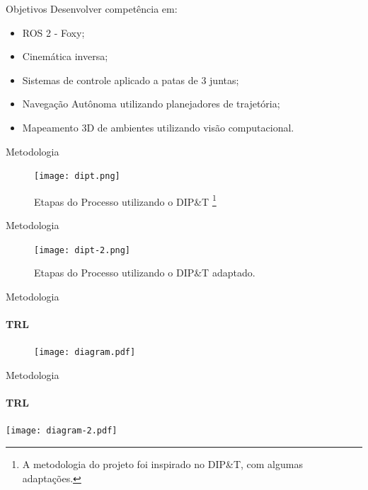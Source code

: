 \begin{frame}[t]{Objetivos}
    Desenvolver competência em:
    \begin{itemize}
        \item ROS 2 - Foxy;
        \item Cinemática inversa;
        \item Sistemas de controle aplicado a patas de 3 juntas;
        \item Navegação Autônoma utilizando planejadores de trajetória;
        \item Mapeamento 3D de ambientes utilizando visão computacional.
    \end{itemize}
\end{frame}

\begin{frame}[t]{Metodologia} 
    \transdissolve[duration=0.5]
    \centering
    \begin{figure}
        \texttt{[image: dipt.png]}\\
        \caption{Etapas do Processo utilizando o DIP\&T \footnote[1]{A metodologia do projeto foi inspirado no DIP\&T, com algumas adaptações.}}
    \end{figure}
    
\end{frame}

\begin{frame}[t]{Metodologia} 
    \transdissolve[duration=0.5]
    \centering
    \begin{figure}
        \texttt{[image: dipt-2.png]}\\
        \caption{Etapas do Processo utilizando o DIP\&T adaptado.}
    \end{figure}
    
\end{frame}

\begin{frame}[t]{Metodologia} 
    \framesubtitle{TRL}
    \transdissolve[duration=0.5]
    \centering
    \begin{figure}
        \texttt{[image: diagram.pdf]}
        
    \end{figure}
\end{frame}

\begin{frame}[t]{Metodologia} 
    \framesubtitle{TRL}
    \transdissolve[duration=0.5]
    \centering
    \texttt{[image: diagram-2.pdf]}
\end{frame}

